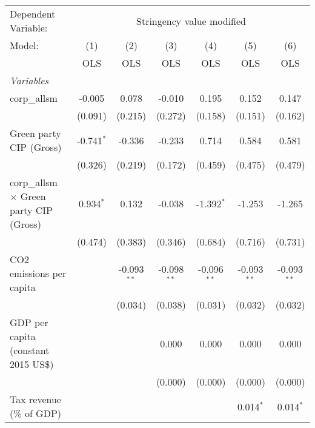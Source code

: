 
\begingroup
\centering
\begin{tabular}{lcccccc}
   \toprule
   Dependent Variable: & \multicolumn{6}{c}{Stringency value modified}\\
   Model:                                         & (1)          & (2)           & (3)           & (4)           & (5)           & (6)\\  
                                                  &  OLS         & OLS           & OLS           & OLS           & OLS           & OLS\\  
   \midrule
   \emph{Variables}\\
   corp\_allsm                                    & -0.005       & 0.078         & -0.010        & 0.195         & 0.152         & 0.147\\   
                                                  & (0.091)      & (0.215)       & (0.272)       & (0.158)       & (0.151)       & (0.162)\\   
   Green party CIP (Gross)                        & -0.741$^{*}$ & -0.336        & -0.233        & 0.714         & 0.584         & 0.581\\   
                                                  & (0.326)      & (0.219)       & (0.172)       & (0.459)       & (0.475)       & (0.479)\\   
   corp\_allsm $\times$ Green party CIP (Gross)   & 0.934$^{*}$  & 0.132         & -0.038        & -1.392$^{*}$  & -1.253        & -1.265\\   
                                                  & (0.474)      & (0.383)       & (0.346)       & (0.684)       & (0.716)       & (0.731)\\   
   CO2 emissions per capita                       &              & -0.093$^{**}$ & -0.098$^{**}$ & -0.096$^{**}$ & -0.093$^{**}$ & -0.093$^{**}$\\   
                                                  &              & (0.034)       & (0.038)       & (0.031)       & (0.032)       & (0.032)\\   
   GDP per capita (constant 2015 US\$)            &              &               & 0.000         & 0.000         & 0.000         & 0.000\\   
                                                  &              &               & (0.000)       & (0.000)       & (0.000)       & (0.000)\\   
   Tax revenue (\% of GDP)                        &              &               &               &               & 0.014$^{*}$   & 0.014$^{*}$\\   

\end{tabular}
